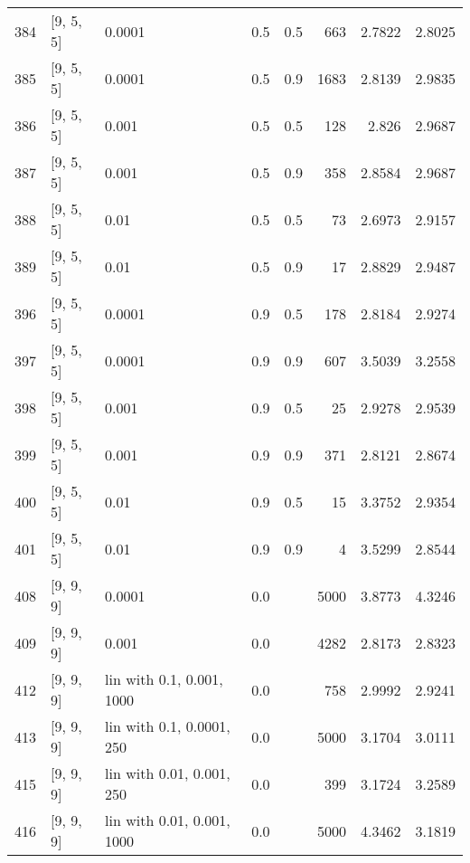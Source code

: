 \begin{longtable}{lllrrrrr}
  384 &          [9, 5, 5] &                      0.0001 &      0.5 & 0.5 &  663 &   2.7822 &   2.8025 \\
  385 &          [9, 5, 5] &                      0.0001 &      0.5 & 0.9 & 1683 &   2.8139 &   2.9835 \\
  386 &          [9, 5, 5] &                       0.001 &      0.5 & 0.5 &  128 &    2.826 &   2.9687 \\
  387 &          [9, 5, 5] &                       0.001 &      0.5 & 0.9 &  358 &   2.8584 &   2.9687 \\
  388 &          [9, 5, 5] &                        0.01 &      0.5 & 0.5 &   73 &   2.6973 &   2.9157 \\
  389 &          [9, 5, 5] &                        0.01 &      0.5 & 0.9 &   17 &   2.8829 &   2.9487 \\
  396 &          [9, 5, 5] &                      0.0001 &      0.9 & 0.5 &  178 &   2.8184 &   2.9274 \\
  397 &          [9, 5, 5] &                      0.0001 &      0.9 & 0.9 &  607 &   3.5039 &   3.2558 \\
  398 &          [9, 5, 5] &                       0.001 &      0.9 & 0.5 &   25 &   2.9278 &   2.9539 \\
  399 &          [9, 5, 5] &                       0.001 &      0.9 & 0.9 &  371 &   2.8121 &   2.8674 \\
  400 &          [9, 5, 5] &                        0.01 &      0.9 & 0.5 &   15 &   3.3752 &   2.9354 \\
  401 &          [9, 5, 5] &                        0.01 &      0.9 & 0.9 &    4 &   3.5299 &   2.8544 \\
  408 &          [9, 9, 9] &                      0.0001 &      0.0 &     & 5000 &   3.8773 &   4.3246 \\
  409 &          [9, 9, 9] &                       0.001 &      0.0 &     & 4282 &   2.8173 &   2.8323 \\
  412 &          [9, 9, 9] &   lin with 0.1, 0.001, 1000 &      0.0 &     &  758 &   2.9992 &   2.9241 \\
  413 &          [9, 9, 9] &   lin with 0.1, 0.0001, 250 &      0.0 &     & 5000 &   3.1704 &   3.0111 \\
  415 &          [9, 9, 9] &   lin with 0.01, 0.001, 250 &      0.0 &     &  399 &   3.1724 &   3.2589 \\
  416 &          [9, 9, 9] &  lin with 0.01, 0.001, 1000 &      0.0 &     & 5000 &   4.3462 &   3.1819 \\

\end{longtable}
